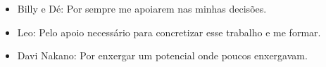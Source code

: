\begin{agradecimentos}
\begin{itemize}
\item Billy e Dé: Por sempre me apoiarem nas minhas decisões.
\item Leo: Pelo apoio necessário para concretizar esse trabalho e me formar.
\item Davi Nakano: Por enxergar um potencial onde poucos enxergavam.
\end{itemize}
\end{agradecimentos}
